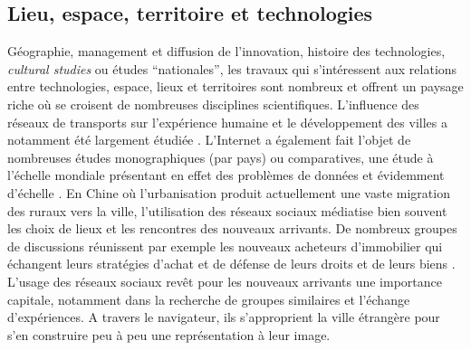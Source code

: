 \subsection[Lieu, espace, territoire et technologies]{Lieu, espace, territoire et technologies}
Géographie, management et diffusion de l’innovation, histoire des technologies, \textit{cultural studies} ou études “nationales”, les travaux qui s’intéressent aux relations entre technologies, espace, lieux et territoires sont nombreux et offrent un paysage riche où se croisent de nombreuses disciplines scientifiques. L’influence des réseaux de transports sur l’expérience humaine et le développement des villes a notamment été largement étudiée \citep{Offner1993,Doulet2001}. L’Internet a également fait l’objet de nombreuses études monographiques (par pays) ou comparatives, une étude à l’échelle mondiale présentant en effet des problèmes de données et évidemment d’échelle \citep{Dupuy2004}. En Chine où l'urbanisation produit actuellement une vaste migration des ruraux vers la ville, l'utilisation des réseaux sociaux médiatise bien souvent les choix de lieux et les rencontres des nouveaux arrivants. De nombreux groupes de discussions réunissent par exemple les nouveaux acheteurs d’immobilier qui échangent leurs stratégies d’achat et de défense de leurs droits et de leurs biens \citep{Li2013}. L’usage des réseaux sociaux revêt pour les nouveaux arrivants une importance capitale, notamment dans la recherche de groupes similaires et l’échange d’expériences. A travers le navigateur, ils s'approprient la ville étrangère pour s'en construire peu à peu une représentation à leur image.

